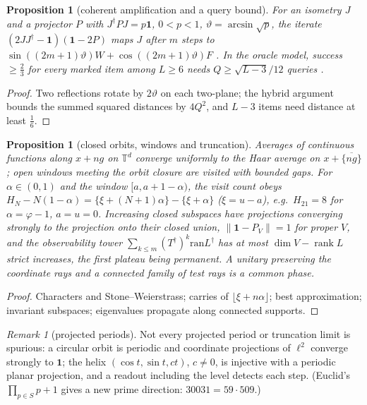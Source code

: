 \documentclass[aps,pra,onecolumn,superscriptaddress,nofootinbib,10pt]{revtex4-2}
\newtheorem{proposition}[theorem]{Proposition}
\theoremstyle{definition}
\theoremstyle{remark}
\newtheorem{remark}[theorem]{Remark}
\newcommand{\rk}{\operatorname{rank}}
\begin{document}
\begin{proposition}[coherent amplification and a query bound]\label{prop:bdamplify}
For an isometry $J$ and a projector $P$ with $J^\dagger PJ=p\mathbf1$, $0<p<1$, $\vartheta=\arcsin\sqrt p$, the iterate $(2JJ^\dagger-\mathbf1)(\mathbf1-2P)$ maps $J$ after $m$ steps to
$\sin((2m+1)\vartheta)W+\cos((2m+1)\vartheta)F$ \cite{ex-Grover97,n4:BHMT}.  In the oracle model, success $\ge\tfrac23$ for every marked item among $L\ge6$ needs
$Q\ge\sqrt{L-3}/12$ queries \cite{n4:BBBV}.
\end{proposition}
\begin{proof}
Two reflections rotate by $2\vartheta$ on each two-plane; the hybrid argument bounds the summed squared distances by $4Q^2$, and $L-3$
items need distance at least $\tfrac16$.
\end{proof}

\begin{proposition}[closed orbits, windows and truncation]\label{prop:bdtorus}
Averages of continuous functions along $x+ng$ on $\mathbb T^d$ converge uniformly to the Haar average on $x+\overline{\{ng\}}$ \cite{n4:Weyl}; open windows
meeting the orbit closure are visited with bounded gaps.  For $\alpha\in(0,1)$ and the window $[a,a+1-\alpha)$, the visit count obeys
$H_N-N(1-\alpha)=\{\xi+(N+1)\alpha\}-\{\xi+\alpha\}$ ($\xi=u-a$), e.g.\ $H_{21}=8$ for $\alpha=\varphi-1$, $a=u=0$.  Increasing closed subspaces have projections converging
strongly to the projection onto their closed union, $\lVert\mathbf1-P_V\rVert=1$ for proper $V$, and the observability tower $\sum_{k\le m}(T^\dagger)^k\mathrm{ran}L^\dagger$
has at most $\dim V-\rk L$ strict increases, the first plateau being permanent.  A unitary preserving the coordinate
rays and a connected family of test rays is a common phase.
\end{proposition}
\begin{proof}
Characters and Stone--Weierstrass; carries of $\lfloor\xi+n\alpha\rfloor$; best approximation; invariant subspaces; eigenvalues propagate along
connected supports.
\end{proof}
\begin{remark}[projected periods]\label{rem:bdhelix}
Not every projected period or truncation limit is spurious: a circular orbit is periodic and coordinate
projections of $\ell^2$ converge strongly to $\mathbf1$; the helix $(\cos t,\sin t,ct)$, $c\ne0$, is injective with a periodic planar projection,
and a readout including the level detects each step.  (Euclid's $\prod_{p\in S}p+1$ gives a new prime direction:
$30031=59\cdot509$.)
\end{remark}
\end{document}
